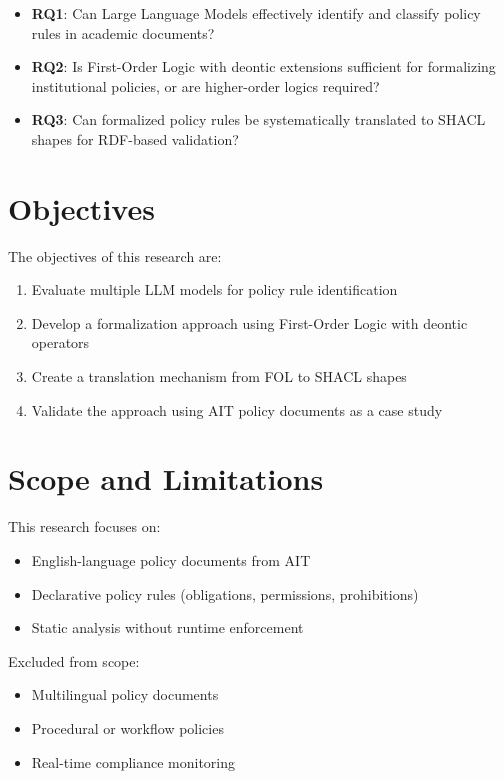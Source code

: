 \begin{itemize}
    \item \textbf{RQ1}: Can Large Language Models effectively identify and classify policy rules in academic documents?
    \item \textbf{RQ2}: Is First-Order Logic with deontic extensions sufficient for formalizing institutional policies, or are higher-order logics required?
    \item \textbf{RQ3}: Can formalized policy rules be systematically translated to SHACL shapes for RDF-based validation?
\end{itemize}

\section{Objectives}

The objectives of this research are:

\begin{enumerate}
    \item Evaluate multiple LLM models for policy rule identification
    \item Develop a formalization approach using First-Order Logic with deontic operators
    \item Create a translation mechanism from FOL to SHACL shapes
    \item Validate the approach using AIT policy documents as a case study
\end{enumerate}

\section{Scope and Limitations}

This research focuses on:
\begin{itemize}
    \item English-language policy documents from AIT
    \item Declarative policy rules (obligations, permissions, prohibitions)
    \item Static analysis without runtime enforcement
\end{itemize}

Excluded from scope:
\begin{itemize}
    \item Multilingual policy documents
    \item Procedural or workflow policies
    \item Real-time compliance monitoring
\end{itemize}

